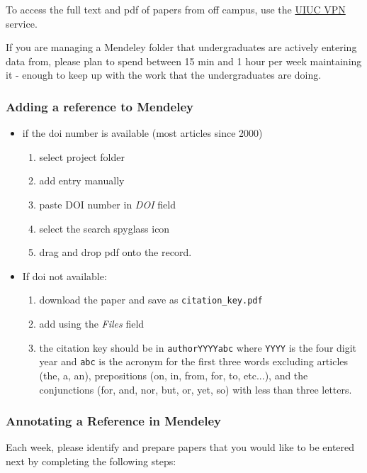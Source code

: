\documentclass[12pt,english,portrait]{article}
\begin{document}
To access the full text and pdf of papers from off campus, use the \href{http://www.cites.illinois.edu/vpn/download-install.html}{UIUC VPN} service.


If you are managing a Mendeley folder that undergraduates are actively entering data from, please plan to spend between 15 min and 1 hour per week maintaining it - enough to keep up with the work that the undergraduates are doing.

\subsubsection{Adding a reference to Mendeley}

\begin{itemize}
\item if the doi number is available (most articles since 2000)
\begin{enumerate}
\item select project folder
\item add entry manually
\item paste DOI number in \textit{DOI} field
\item select the search spyglass icon
\item drag and drop pdf onto the record. 
\end{enumerate}
\item If doi not available:
\begin{enumerate}
\item download the paper and save as  \verb+citation_key.pdf+
\item add using the \textit{Files} field
\item the citation key should be in \verb+authorYYYYabc+ where \verb+YYYY+ is the four digit year and \verb+abc+ is the acronym for the first three words excluding articles (the, a, an), prepositions (on, in, from, for, to, etc...), and the conjunctions (for, and, nor, but, or, yet, so) with less than three letters.
\end{enumerate}
\end{itemize}

\subsubsection{Annotating a Reference in Mendeley}
Each week, please identify and prepare papers that you would like to be entered next by completing the following steps:
\end{document}

